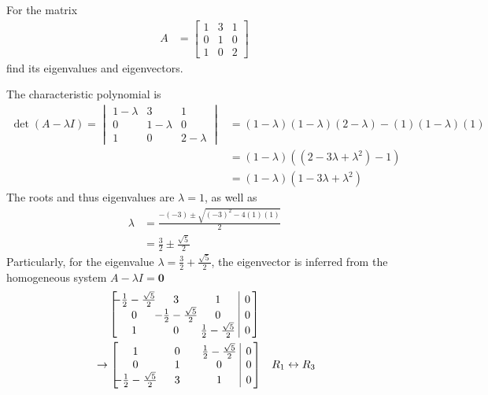 \begin{exmp}
\label{exmp:eigenfull}
For the matrix
\begin{align*}
A &= 
\begin{bmatrix}
1 & 3 & 1 \\
0 & 1 & 0 \\
1 & 0 & 2
\end{bmatrix}
\end{align*}
find its eigenvalues and eigenvectors.
\end{exmp}
\begin{solution}
The characteristic polynomial is
\begin{align*}
\det(A-\lambda I) = \begin{vmatrix}
1-\lambda & 3 & 1 \\
0 & 1-\lambda & 0 \\
1 & 0 & 2-\lambda 
\end{vmatrix} &=
(1-\lambda)(1-\lambda)(2-\lambda) - (1)(1-\lambda)(1) \\
&= (1-\lambda)((2-3\lambda+\lambda^2) - 1) \\
&= (1-\lambda)(1-3\lambda+\lambda^2)
\end{align*}
The roots and thus eigenvalues are $\lambda = 1$, as well as
\begin{align*}
\lambda &= \frac{-(-3) \pm \sqrt{(-3)^2 - 4(1)(1)}}{2} \\
&= \frac{3}{2} \pm \frac{\sqrt{5}}{2}
\end{align*}
Particularly, for the eigenvalue $\lambda = \frac{3}{2} + \frac{\sqrt{5}}{2}$, the eigenvector is inferred from the homogeneous system $A - \lambda I = \textbf{0}$
\begin{align*}
&\quad\; \left[\begin{array}{@{\,}wc{28pt}wc{28pt}wc{28pt}|c@{\,}}
-\frac{1}{2}-\frac{\sqrt{5}}{2} & 3 & 1 & 0 \\
0 & -\frac{1}{2}-\frac{\sqrt{5}}{2} & 0 & 0 \\
1 & 0 & \frac{1}{2}-\frac{\sqrt{5}}{2} & 0
\end{array}\right] \\
&\to
\left[\begin{array}{@{\,}wc{28pt}wc{28pt}wc{28pt}|c@{\,}}
1 & 0 & \frac{1}{2}-\frac{\sqrt{5}}{2} & 0 \\
0 & 1 & 0 & 0 \\
-\frac{1}{2}-\frac{\sqrt{5}}{2} & 3 & 1 & 0
\end{array}\right] & \begin{aligned}
R_1 &\leftrightarrow R_3 \\

\end{aligned}
\end{align*}
\end{solution}
